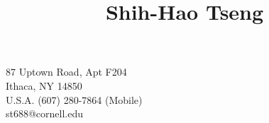 \title{Shih-Hao Tseng}{
87 Uptown Road, Apt F204\\
Ithaca, NY 14850 \\
U.S.A.
}{
(607) 280-7864 (Mobile) \\
st688@cornell.edu
}